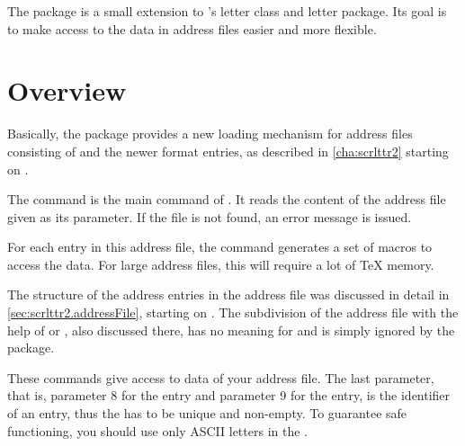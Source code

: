 The  package is a small extension to \KOMAScript{}'s letter
class and letter package. Its goal is to make access to the data in address
files easier and more flexible.

\section{Overview}
Basically, the package provides a new loading mechanism for address files
consisting of  and the newer
 format entries, as described in
\autoref{cha:scrlttr2} starting on .

\begin{Declaration}
\end{Declaration}%
The  command is the main command of .
It reads the content of the address file given as its
parameter. If the file is not found, an error message is issued.

For each entry in this address file, the command generates a set of
macros to access the data. For large address files, this will require
a lot of \TeX{} memory.
%
\EndIndexGroup

\begin{Declaration}%
\end{Declaration}%
The structure of the address entries in the address file was discussed in
detail in \autoref{sec:scrlttr2.addressFile}, starting on
. The subdivision of the address file with
the help of  or , also discussed there, has no
meaning for  and is simply ignored by the package.%
\EndIndexGroup

\begin{Declaration}
\end{Declaration}%
These commands give access to data of your address file. The last parameter,
that is, parameter 8 for the  entry and
parameter 9 for the  entry, is the
identifier of an entry, thus the  has to be unique and non-empty.
To guarantee safe functioning, you should use only ASCII letters in the
.

